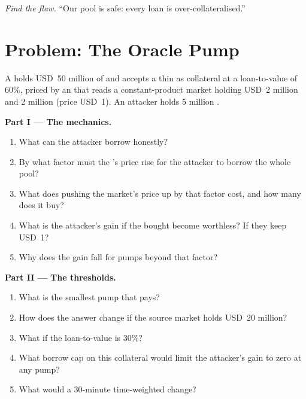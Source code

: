 \begin{exercise}[$\star\star\star$]\label{exo:m3:defi-credit-and-leverage:8}
\emph{Find the flaw.} ``Our pool is safe: every loan is over-collateralised.''
\end{exercise}

\section{Problem: The Oracle Pump}

\begin{problem}\label{pb:m3:defi-credit-and-leverage:1}
A  holds USD~50 million of  and accepts a thin  as collateral at a loan-to-value of 60\%, priced by an  that reads a
constant-product market holding USD~2 million and 2 million  (price USD~1). An attacker holds 5 million .

\medskip\noindent\textbf{Part I --- The mechanics.}
\begin{enumerate}
\item What can the attacker borrow honestly?
\item By what factor must the 's price rise for the attacker to borrow the whole pool?
\item What does pushing the market's price up by that factor cost, and how many  does it buy?
\item What is the attacker's gain if the  bought become worthless? If they keep USD~1?
\item Why does the gain fall for pumps beyond that factor?
\end{enumerate}

\medskip\noindent\textbf{Part II --- The thresholds.}
\begin{enumerate}[resume]
\item What is the smallest pump that pays?
\item How does the answer change if the source market holds USD~20 million?
\item What if the loan-to-value is 30\%?
\item What borrow cap on this collateral would limit the attacker's gain to zero at any pump?
\item What would a 30-minute time-weighted  change?
\end{enumerate}


\end{problem}
